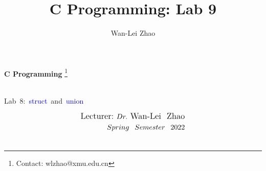\documentclass[t]{beamer}
\title{C Programming: Lab 9}
\author{Wan-Lei Zhao}
\newcommand\blfootnote[1]{
  \begingroup
  \renewcommand\thefootnote{}\footnote{#1}
  \addtocounter{footnote}{-1}
  \endgroup
}
\begin{document}
\begin{frame}
   \begin{center}
    \vspace{24pt}
    \Huge\textbf{C Programming}\blfootnote{Contact: wlzhao@xmu.edu.cn}\\
     \Huge{\mbox{Lab 8: \textcolor{blue}{struct} and \textcolor{blue}{union}}}
    \vspace{36pt}
  \end{center}
  \begin{align*}
   \vspace{18pt}
      \large{\mbox{Lecturer:}~Dr.~\mbox{Wan-Lei~~Zhao}} \\
      \large{Spring~~Semester~~2022} \\
   \vspace{30pt}
  \end{align*}
\end{frame}



\end{document}

